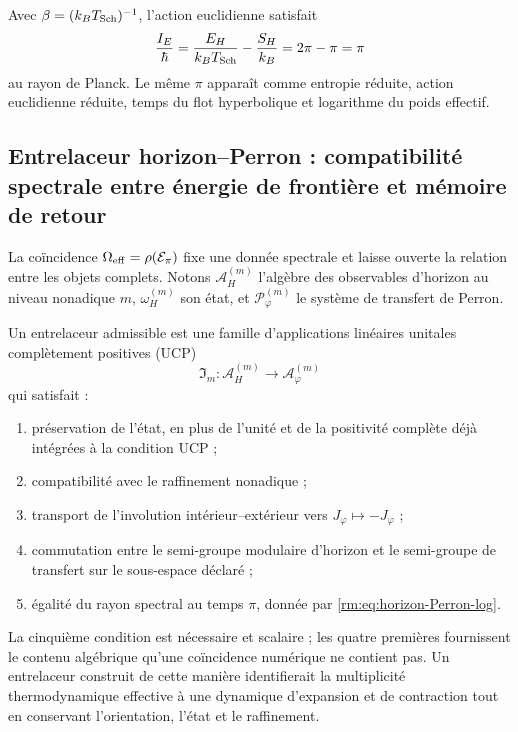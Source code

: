 Avec \(\beta=(k_BT_{\rm Sch})^{-1}\), l’action euclidienne satisfait
\begin{equation}
 \frac{I_E}{\hbar}
 =\frac{E_H}{k_BT_{\rm Sch}}-\frac{S_H}{k_B}
 =2\pi-\pi=\pi
 \label{rm:eq:horizon-Schwarzschild-action}
\end{equation}
au rayon de Planck. Le même \(\pi\) apparaît comme entropie réduite, action euclidienne réduite, temps du flot hyperbolique et logarithme du poids effectif.

\subsection{Entrelaceur horizon–Perron : compatibilité spectrale entre énergie de frontière et mémoire de retour}

La coïncidence \(\Omega_{\rm eff}=\rho(\mathcal E_\pi)\) fixe une donnée spectrale et laisse ouverte la relation entre les objets complets. Notons \(\mathcal A_H^{(m)}\) l’algèbre des observables d’horizon au niveau nonadique \(m\), \(\omega_H^{(m)}\) son état, et \(\mathcal P_\varphi^{(m)}\) le système de transfert de Perron.

\begin{definition}
\label{rm:def:horizon-Perron-intertwiner}
Un entrelaceur admissible est une famille d’applications linéaires unitales complètement positives (UCP)
\begin{equation}
 \mathfrak I_m:\mathcal A_H^{(m)}\longrightarrow
 \mathcal A_\varphi^{(m)}
 \label{rm:eq:horizon-intertwiner}
\end{equation}
qui satisfait :
\begin{enumerate}[label=\roman*)]
 \item préservation de l’état, en plus de l’unité et de la positivité complète déjà intégrées à la condition UCP ;
 \item compatibilité avec le raffinement nonadique ;
 \item transport de l’involution intérieur--extérieur vers \(J_\varphi\mapsto-J_\varphi\) ;
 \item commutation entre le semi-groupe modulaire d’horizon et le semi-groupe de transfert sur le sous-espace déclaré ;
 \item égalité du rayon spectral au temps \(\pi\), donnée par \cref{rm:eq:horizon-Perron-log}.
\end{enumerate}
\end{definition}

La cinquième condition est nécessaire et scalaire ; les quatre premières fournissent le contenu algébrique qu’une coïncidence numérique ne contient pas. Un entrelaceur construit de cette manière identifierait la multiplicité thermodynamique effective à une dynamique d’expansion et de contraction tout en conservant l’orientation, l’état et le raffinement.

